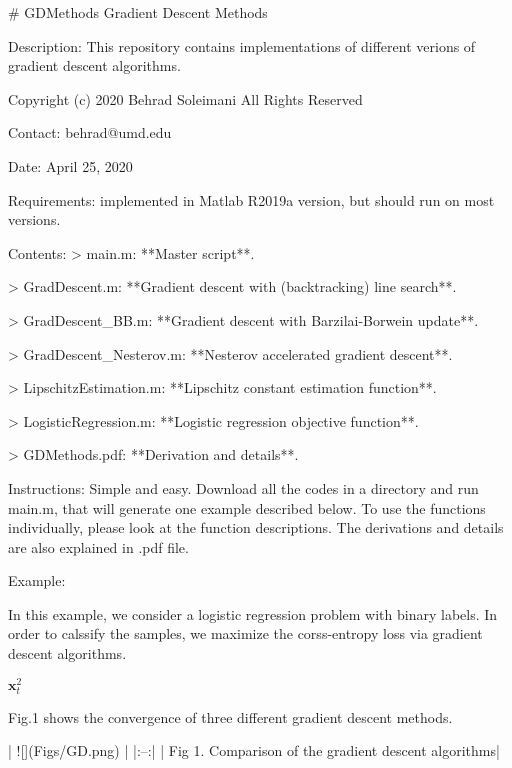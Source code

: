 # GDMethods
Gradient Descent Methods

Description: This repository contains implementations of different verions of gradient descent algorithms.

Copyright (c) 2020 Behrad Soleimani All Rights Reserved

Contact: behrad@umd.edu

Date: April 25, 2020

Requirements: implemented in Matlab R2019a version, but should run on most versions.

Contents: 
> main.m:       **Master script**. 

> GradDescent.m:       **Gradient descent with (backtracking) line search**.

> GradDescent_BB.m:  **Gradient descent with Barzilai-Borwein update**.

> GradDescent_Nesterov.m:  **Nesterov accelerated gradient descent**.

> LipschitzEstimation.m:  **Lipschitz constant estimation function**.

> LogisticRegression.m:  **Logistic regression objective function**.

> GDMethods.pdf: **Derivation and details**.

Instructions: Simple and easy. Download all the codes in a directory and run main.m, that will generate one example described below. To use the functions individually, please look at the function descriptions. The derivations and details are also explained in .pdf file.

Example:

In this example, we consider a logistic regression problem with binary labels. In order to calssify the samples, we maximize the corss-entropy loss via gradient descent algorithms.

$\mathbf{x}_t^2$


Fig.1 shows the convergence of three different gradient descent methods.

| ![](Figs/GD.png) | 
|:--:| 
| Fig 1. Comparison of the gradient descent algorithms|

